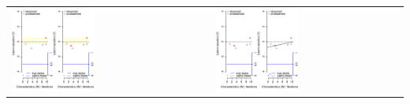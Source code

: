 \begin{table}[thbp!]
\begin{center}
\begin{tabular}{lll}
\includegraphics[width=0.45\textwidth]{./inputs/figures/Vobs2} & & \includegraphics[width=0.45\textwidth]{./inputs/figures/alpha}
\end{tabular} 
\end{center}
\end{table}





